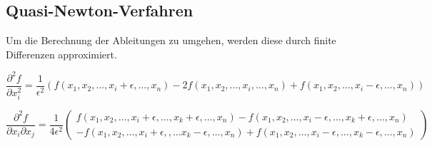   
\subsection{Quasi-Newton-Verfahren}
  Um die Berechnung der Ableitungen zu umgehen, werden diese durch finite Differenzen approximiert. 
  
  $$\frac{\partial^2 f}{\partial x_i^2} = \frac{1}{\epsilon^2} 
  \left( f(x_1, x_2, \ldots, x_i+\epsilon, \ldots, x_n) - 2 f(x_1, x_2, \ldots, x_i, \ldots, x_n) + f(x_1, x_2, \ldots, x_i-\epsilon, \ldots, x_n) \right)$$
  
  $$\frac{\partial^2 f}{\partial x_i \partial x_j} = \frac{1}{4 \epsilon^2} \begin{pmatrix}
    f(x_1, x_2, \ldots, x_i+\epsilon, \ldots, x_k+\epsilon, \ldots, x_n) - f(x_1, x_2, \ldots, x_i-\epsilon, \ldots, x_k+\epsilon, \ldots, x_n)\\
    -f(x_1, x_2, \ldots, x_i+\epsilon, , \ldots x_k-\epsilon, \ldots, x_n) + f(x_1, x_2, \ldots, x_i-\epsilon, \ldots, x_k-\epsilon, \ldots, x_n)
  \end{pmatrix}$$